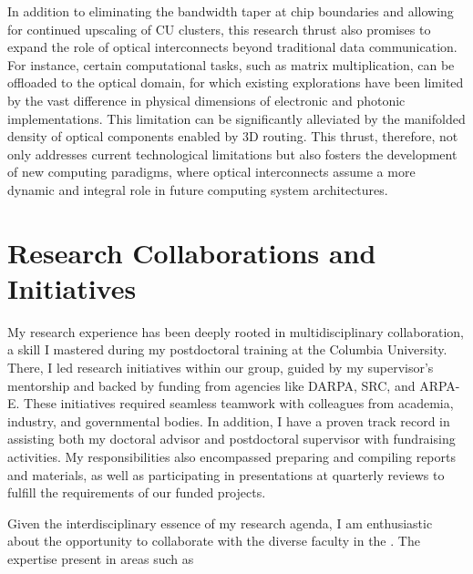 In addition to eliminating the bandwidth taper at chip boundaries and allowing for continued upscaling of CU clusters, this research thrust also promises to expand the role of optical interconnects beyond traditional data communication. For instance, certain computational tasks, such as matrix multiplication, can be offloaded to the optical domain, for which existing explorations have been limited by the vast difference in physical dimensions of electronic and photonic implementations. This limitation can be significantly alleviated by the manifolded density of optical components enabled by 3D routing. This thrust, therefore, not only addresses current technological limitations but also fosters the development of new computing paradigms, where optical interconnects assume a more dynamic and integral role in future computing system architectures.



\section{Research Collaborations and Initiatives}

My research experience has been deeply rooted in multidisciplinary collaboration, a skill I mastered during my postdoctoral training at the Columbia University. There, I led research initiatives within our group, guided by my supervisor's mentorship and backed by funding from agencies like DARPA, SRC, and ARPA-E. These initiatives required seamless teamwork with colleagues from academia, industry, and governmental bodies. In addition, I have a proven track record in assisting both my doctoral advisor and postdoctoral supervisor with fundraising activities. My responsibilities also encompassed preparing and compiling reports and materials, as well as participating in presentations at quarterly reviews to fulfill the requirements of our funded projects.

Given the interdisciplinary essence of my research agenda, I am enthusiastic about the opportunity to collaborate with the diverse faculty in the \appDept{}. The expertise present in areas such as%